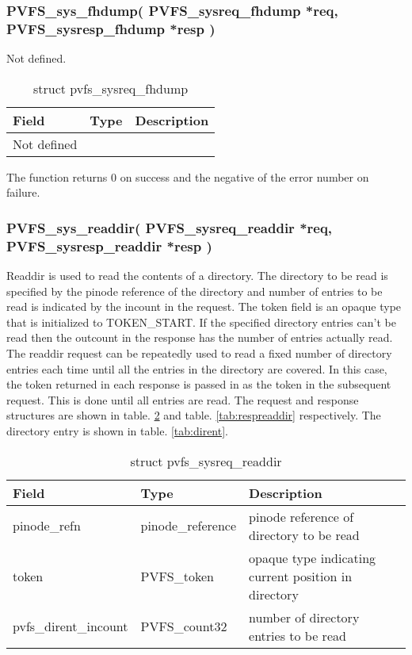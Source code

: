\documentclass[11pt, letterpaper]{article}
\begin{document}
\subsubsection{PVFS\_sys\_fhdump(
PVFS\_sysreq\_fhdump *req,
PVFS\_sysresp\_fhdump *resp
)}

Not defined.

\begin{table}[H]
\begin{tabular}{|l|l|l|}
\hline
Field & Type & Description \\
\hline
\hline
Not defined & & \\
\hline
\end{tabular}
\caption{struct pvfs\_sysreq\_fhdump}\label{tab:reqfhdump}
\end{table}

The function returns 0 on success and the negative of the error
number on failure.

\subsubsection{PVFS\_sys\_readdir(
PVFS\_sysreq\_readdir *req,
PVFS\_sysresp\_readdir *resp
)}

Readdir is used to read the contents of a directory. The directory
to be read is specified by the pinode reference of the directory
and number of entries to be read is indicated by the incount in the
request. The token field is an opaque type that is initialized to
TOKEN\_START. If the specified directory entries can't be read then
the outcount in the response has the number of entries actually read.
The readdir request can be repeatedly used to read a fixed number of
directory entries each time until all the entries in the directory
are covered. In this case, the token returned in each response is
passed in as the token in the subsequent request. This is done until
all entries are read. The request and response structures are shown 
in table. \ref{tab:reqreaddir} and table. \ref{tab:respreaddir} 
respectively. The directory entry is shown in table. \ref{tab:dirent}.

\begin{table}[H]
\begin{tabular}{|l|l|l|}
\hline
Field & Type & Description \\
\hline
\hline
pinode\_refn & pinode\_reference & pinode reference of directory to be
read \\
\hline
token & PVFS\_token & opaque type indicating current position in directory \\
\hline
pvfs\_dirent\_incount & PVFS\_count32 & number of directory entries to
be read \\
\hline
\hline
\end{tabular}
\caption{struct pvfs\_sysreq\_readdir}\label{tab:reqreaddir}
\end{table}
\end{document}
